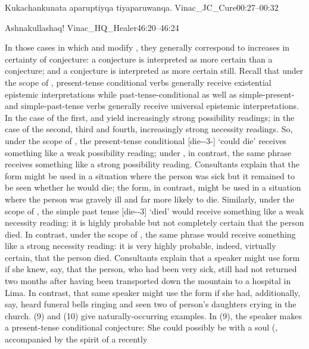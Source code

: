 %
{Kukachankunata aparuptiyqa tiyaparuwanqa.}%
{}%
{Vinac\_JC\_Cure}{00:27--00:32}%

%
{\textexclamdown{}Ashnakullashaq!}%
{}%
{Vinac\_HQ\_Healer}{46:20--46:24}%

In those cases in which  and  modify , they generally correspond to increases in certainty of conjecture: a  conjecture is interpreted as more certain than a  conjecture; and a  conjecture is interpreted as more certain still. Recall that under the scope of , present-tense conditional verbs generally receive existential epistemic interpretations while past-tense-conditional as well as simple-present- and simple-past-tense verbs generally receive universal epistemic interpretations. In the case of the first,  and  yield increasingly strong possibility readings; in the case of the second, third and fourth, increasingly strong necessity readings. So, under the scope of , the present-tense conditional  [die--3-] `could die' receives something like a weak possibility reading; under , in contrast, the same phrase receives something like a strong possibility reading. Consultants explain that the \phono{-\uo{}} form might be used in a situation where the person was sick but it remained to be seen whether he would die; the  form, in contrast, might be used in a situation where the person was gravely ill and far more likely to die. Similarly, under the scope of , the simple past tense  [die--3] `died' would receive something like a weak necessity reading: it is highly probable but not completely certain that the person died. In contrast, under the scope of , the same phrase would receive something like a strong necessity reading: it is very highly probable, indeed, virtually certain, that the person died. Consultants explain that a speaker might use \phono{-\uo{}} form if she knew, say, that the person, who had been very sick, still had not returned two months after having been transported down the mountain to a hospital in Lima. In contrast, that same speaker might use the  form if she had, additionally, say, heard funeral bells ringing and seen two of person's daughters crying in the church. (9) and (10) give naturally-occurring examples. In (9), the speaker makes a present-tense conditional  conjecture: She could possibly be with a soul (\ie, accompanied by the spirit of a recently 